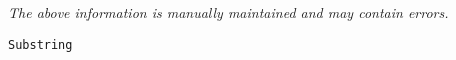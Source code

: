 \label{pkg:substring}

{\tiny \it The above information is manually maintained and may contain errors.}
\begin{verbatim}
Substring
\end{verbatim}
